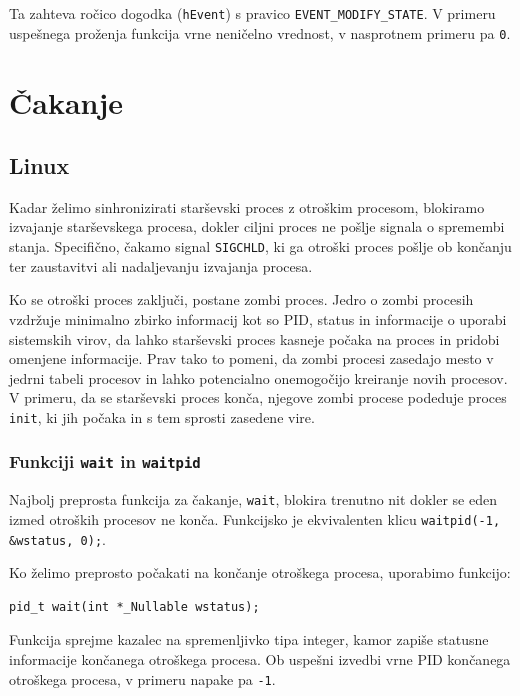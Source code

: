 \documentclass[a4paper,12pt,openright]{book}
\begin{document}
Ta zahteva ročico dogodka (\texttt{hEvent}) s pravico \texttt{EVENT\_MODIFY\_STATE}.
V primeru uspešnega proženja funkcija vrne neničelno vrednost, v nasprotnem primeru pa \texttt{0}.

\section{Čakanje}

\subsection{Linux} \label{ssec:linux_syscalls:waiting}

Kadar želimo sinhronizirati starševski proces z otroškim procesom, blokiramo izvajanje starševskega procesa, dokler ciljni proces ne pošlje signala o spremembi stanja.
Specifično, čakamo signal \texttt{SIGCHLD}, ki ga otroški proces pošlje ob končanju ter zaustavitvi ali nadaljevanju izvajanja procesa.

Ko se otroški proces zaključi, postane zombi proces.
Jedro o zombi procesih vzdržuje minimalno zbirko informacij kot so PID, status in informacije o uporabi sistemskih virov, da lahko starševski proces kasneje počaka na proces in pridobi omenjene informacije.
Prav tako to pomeni, da zombi procesi zasedajo mesto v jedrni tabeli procesov in lahko potencialno onemogočijo kreiranje novih procesov.
V primeru, da se starševski proces konča, njegove zombi procese podeduje proces \texttt{init}, ki jih počaka in s tem sprosti zasedene vire.

\subsubsection{Funkciji \texttt{wait} in \texttt{waitpid}}

Najbolj preprosta funkcija za čakanje, \texttt{wait}, blokira trenutno nit dokler se eden izmed otroških procesov ne konča.
Funkcijsko je ekvivalenten klicu \verb|waitpid(-1, &wstatus, 0);|.

Ko želimo preprosto počakati na končanje otroškega procesa, uporabimo funkcijo:
\begin{lstlisting}[style=func]
 pid_t wait(int *_Nullable wstatus);
\end{lstlisting}

Funkcija sprejme kazalec na spremenljivko tipa integer, kamor zapiše statusne informacije končanega otroškega procesa.
Ob uspešni izvedbi vrne PID končanega otroškega procesa, v primeru napake pa \texttt{-1}.
\end{document}
